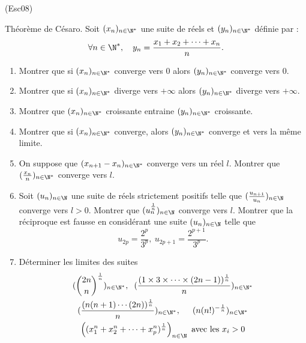 \begin{tiny}(Esc08)\end{tiny} Th{\'e}or{\`e}me de C{\'e}saro.\newline
Soit $(x_{n})_{n\in \N^{*}}$ une suite de r{\'e}els et $(y_{n})_{n\in \N^{*}}$ d{\'e}finie par :
\[
\forall n\in \N^{*},\quad y_{n}=\frac{x_{1}+x_{2}+\cdots + x_{n}}{n}.
\]
\begin{enumerate}
\item  Montrer que si $(x_{n})_{n\in \N^{*}}$ converge vers $0$ alors $(y_{n})_{n\in \N^{*}}$ converge vers 0.

\item  Montrer que si $(x_{n})_{n\in \N^{*}}$ diverge vers $+\infty$ alors $(y_{n})_{n\in \N^{*}}$ diverge vers $+\infty$.

\item Montrer que $(x_{n})_{n\in \N^{*}}$ croissante entraine $(y_{n})_{n\in \N^{*}}$ croissante.

\item  Montrer que si $(x_{n})_{n\in \N^{*}}$ converge, alors $(y_{n})_{n\in \N^{*}}$ converge et vers la m{\^e}me limite.

\item  On suppose que $(x_{n+1}-x_{n})_{n\in \N^{*}}$ converge vers un r{\'e}el $l$. Montrer que $(\frac{x_{n}}{n})_{n\in
\N^{*}}$ converge vers $l$.

\item  Soit $(u_{n})_{n\in \N}$ une suite de réels strictement positifs telle que $(\frac{u_{n+1}}{u_{n}})_{n\in
\N}$ converge vers $l>0$.\newline
Montrer que $(u_{n}^{\frac{1}{n}})_{n\in \N}$ converge vers $l$. Montrer que la r{\'e}ciproque est fausse en consid{\'e}rant une suite
$(u_{n})_{n\in \N}$ telle que
\[
u_{2p}=\frac{2^{p}}{3^{p}},\
u_{2p+1}=\frac{2^{p+1}}{3^{p}}\text{.}
\]

\item  D{\'e}terminer les limites des suites
\begin{multline*}
(\binom{2n}{n}^{\frac{1}{n}})_{n\in \N^{*}}, \hspace{0.2cm} (\frac{(1\times 3\times \cdots \times (2n-1))^{\frac{1}{n}}}{n})_{n\in \N^{*}}\\
(\frac{(n(n+1)\cdots (2n))^{\frac{1}{n}}}{n})_{n\in \N^{*}} , \hspace{0.5cm}
(n(n!)_{{}}^{-\frac{1}{n}})_{n\in \N^{*}} \\
\left((x_1^n + x_2^n + \cdots + x_p^n)^{\frac{1}{n}}\right)_{n\in \N}\text{ avec les } x_i >0 
\end{multline*}

\end{enumerate}
